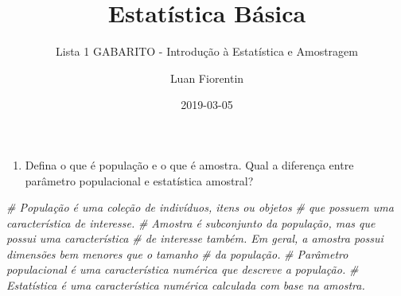 \documentclass[]{article}
\title{Estatística Básica}
\subtitle{Lista 1 GABARITO - Introdução à Estatística e Amostragem}
\author{Luan Fiorentin}
\date{2019-03-05}
\newenvironment{Shaded}{\begin{snugshade}}{\end{snugshade}}
\newcommand{\CommentTok}[1]{\textcolor[rgb]{0.56,0.35,0.01}{\textit{#1}}}
\providecommand{\tightlist}{%
  \setlength{\itemsep}{0pt}\setlength{\parskip}{0pt}}
\begin{document}
\maketitle

\begin{enumerate}
\def\labelenumi{\arabic{enumi}.}
\tightlist
\item
  Defina o que é população e o que é amostra. Qual a diferença entre
  parâmetro populacional e estatística amostral?
\end{enumerate}

\begin{Shaded}
\begin{Highlighting}[]
\CommentTok{# População é uma coleção de indivíduos, itens ou objetos}
\CommentTok{# que possuem uma característica de interesse.}
\CommentTok{# Amostra é subconjunto da população, mas que possui uma característica}
\CommentTok{# de interesse também. Em geral, a amostra possui dimensões bem menores que o tamanho }
\CommentTok{# da população.}
\CommentTok{# Parâmetro populacional é uma característica numérica que descreve a população.}
\CommentTok{# Estatística é uma característica numérica calculada com base na amostra.}
\end{Highlighting}
\end{Shaded}
\end{document}
